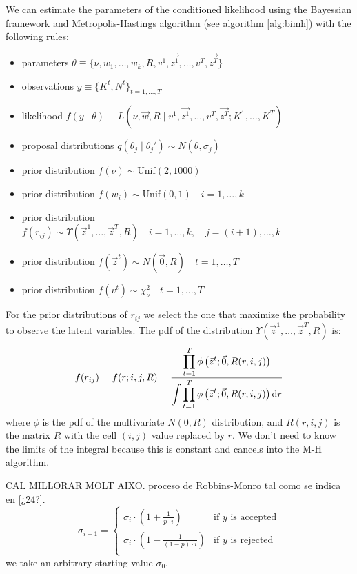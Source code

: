 \documentclass[11pt,fleqn]{book} %
\begin{document}
\begin{proposition}
	We can estimate the parameters of the conditioned likelihood using
	the Bayessian framework and Metropolis-Hastings algorithm 
	(see algorithm \ref{alg:bimh}) with the following rules:
	\begin{itemize}
		\item parameters $\theta \equiv \{ \nu,w_1,\dots,w_k,R,v^1,\vec{z^1},\dots,v^T,\vec{z^T}\}$
		\item observations $y \equiv \{K^t, N^t\}_{t=1,\dots,T}$
		\item likelihood $f(y \mid \theta) \equiv L(\nu,\vec{w},R  \mid  v^1,\vec{z^1},\dots,v^T,\vec{z^T} ; K^1,\dots,K^T)$
		\item proposal distributions $q(\theta_j \mid \theta_j') \sim N(\theta,\sigma_j)$
		\item prior distribution $f(\nu) \sim \text{Unif}(2,1000)$
		\item prior distribution $f(w_i) \sim \text{Unif}(0,1) \quad i=1,\dots,k$
		\item prior distribution $f(r_{ij}) \sim \Upsilon(\vec{z}^1,\dots,\vec{z}^T,R) \quad i=1,\dots,k, \quad j=(i+1),\dots,k$
		\item prior distribution $f(\vec{z}^t) \sim N(\vec{0},R) \quad t=1,\dots,T$
		\item prior distribution $f(v^t) \sim \chi_{\nu}^2 \quad t=1,\dots,T$
	\end{itemize}
	For the prior distributions of $r_{ij}$ we select the one that 
	maximize the probability to observe the latent variables. The 
	pdf of the distribution $\Upsilon(\vec{z}^1,\dots,\vec{z}^T,R)$ is:
	\begin{displaymath}
		f(r_{ij}) = f(r; i,j,R) = \frac
		{\displaystyle \prod_{t=1}^{T} \phi\left( \vec{z}^t; \vec{0}, R(r,i,j) \right)}
		{\displaystyle \int \prod_{t=1}^{T} \phi\left( \vec{z}^t; \vec{0}, R(r,i,j) \right) \mathop{\mathrm{{}d}}\mathopen{} r}
	\end{displaymath}
	where $\phi$ is the pdf of the multivariate $N(0,R)$ distribution,
	and $R(r,i,j)$ is the matrix $R$ with the cell $(i,j)$ value 
	replaced by $r$. We don't need to know the limits of the integral
	because this is constant and cancels into the M-H algorithm.
\end{proposition}

\begin{proposition}
CAL MILLORAR MOLT AIXO. \cite{garthwaite:2010}
proceso de Robbins-Monro tal como se indica en [¿24?].
	\begin{displaymath}
		\sigma_{i+1} = \left\{
		\begin{array}{ll}
			\sigma_i \cdot \left( 1 + \frac{1}{p \cdot i} \right) & \text{if $y$ is accepted} \\
			\sigma_i \cdot \left( 1 - \frac{1}{(1-p) \cdot i} \right) & \text{if $y$ is rejected} \\
		\end{array}
		\right.
	\end{displaymath}
	we take an arbitrary starting value $\sigma_0$.
\end{proposition}
\end{document}
